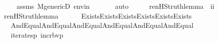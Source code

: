 \begin{isabellebody}
\ \ \ \ \isamarkupfalse%
\ assms\ M{\isacharunderscore}{\kern0pt}genericD\ envin\ \isanewline
\ \ \ \ \isamarkupfalse%
\ auto\isanewline
{}\isamarkupfalse%
%
\endisatagproof
{\isafoldproof}%
%
\isadelimproof
\ \isanewline
%
\endisadelimproof
\isanewline
{}\isamarkupfalse%
\ \isanewline
\ \ ren{\isacharunderscore}{\kern0pt}HS{\isacharunderscore}{\kern0pt}truth{\isacharunderscore}{\kern0pt}lemma\ {\isacharcolon}{\kern0pt}{\isacharcolon}{\kern0pt}\ {\isachardoublequoteopen}i{\isasymRightarrow}i{\isachardoublequoteclose}\ \isanewline
\ \ {\isachardoublequoteopen}ren{\isacharunderscore}{\kern0pt}HS{\isacharunderscore}{\kern0pt}truth{\isacharunderscore}{\kern0pt}lemma{\isacharparenleft}{\kern0pt}{\isasymphi}{\isacharparenright}{\kern0pt}\ {\isasymequiv}\ \isanewline
\ \ \ \ Exists{\isacharparenleft}{\kern0pt}Exists{\isacharparenleft}{\kern0pt}Exists{\isacharparenleft}{\kern0pt}Exists{\isacharparenleft}{\kern0pt}Exists{\isacharparenleft}{\kern0pt}Exists{\isacharparenleft}{\kern0pt}\isanewline
\ \ \ \ And{\isacharparenleft}{\kern0pt}Equal{\isacharparenleft}{\kern0pt}{}{\isacharcomma}{\kern0pt}{}{\isacharparenright}{\kern0pt}{\isacharcomma}{\kern0pt}And{\isacharparenleft}{\kern0pt}Equal{\isacharparenleft}{\kern0pt}{}{\isacharcomma}{\kern0pt}{}{\isacharparenright}{\kern0pt}{\isacharcomma}{\kern0pt}And{\isacharparenleft}{\kern0pt}Equal{\isacharparenleft}{\kern0pt}{}{\isacharcomma}{\kern0pt}{}{}{\isacharparenright}{\kern0pt}{\isacharcomma}{\kern0pt}And{\isacharparenleft}{\kern0pt}Equal{\isacharparenleft}{\kern0pt}{}{\isacharcomma}{\kern0pt}{}{}{\isacharparenright}{\kern0pt}{\isacharcomma}{\kern0pt}And{\isacharparenleft}{\kern0pt}Equal{\isacharparenleft}{\kern0pt}{}{\isacharcomma}{\kern0pt}{}{}{\isacharparenright}{\kern0pt}{\isacharcomma}{\kern0pt}And{\isacharparenleft}{\kern0pt}Equal{\isacharparenleft}{\kern0pt}{}{\isacharcomma}{\kern0pt}{}{\isacharparenright}{\kern0pt}{\isacharcomma}{\kern0pt}\isanewline
\ \ \ \ iterates{\isacharparenleft}{\kern0pt}{\isasymlambda}p{\isachardot}{\kern0pt}\ incr{\isacharunderscore}{\kern0pt}bv{\isacharparenleft}{\kern0pt}p{\isacharparenright}{\kern0pt}{\isacharbackquote}{\kern0pt}{}\ {\isacharcomma}{\kern0pt}\ {}{\isacharcomma}{\kern0pt}\ {\isasymphi}{\isacharparenright}{\kern0pt}{\isacharparenright}{\kern0pt}{\isacharparenright}{\kern0pt}{\isacharparenright}{\kern0pt}{\isacharparenright}{\kern0pt}{\isacharparenright}{\kern0pt}{\isacharparenright}{\kern0pt}{\isacharparenright}{\kern0pt}{\isacharparenright}{\kern0pt}{\isacharparenright}{\kern0pt}{\isacharparenright}{\kern0pt}{\isacharparenright}{\kern0pt}{\isacharparenright}{\kern0pt}{\isachardoublequoteclose}\isanewline

\end{isabellebody}
